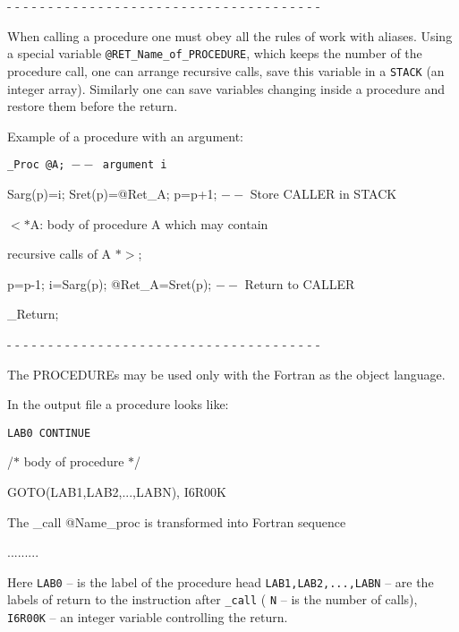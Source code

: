- - - - - - - - - - - - - - - - - - - - - - - - - - - - - - - - - - - - - -

When calling a procedure one must obey all the rules of work
with aliases.
Using a special variable
       {\tt @RET\_Name\_of\_PROCEDURE},
which keeps the number of the procedure call, one can arrange
recursive calls, save this variable in a
       {\tt STACK} (an integer array). Similarly one can save
variables changing inside a procedure and restore them before the
return.

       Example of a procedure with an argument:

       {\tt    \_Proc @A; $--$ argument  i

             Sarg(p)=i; Sret(p)=@Ret\_A; p=p+1; $--$ Store CALLER in STACK

               $<*$A: body of procedure A which may contain

                    recursive calls of A $*>$;

             p=p-1; i=Sarg(p); @Ret\_A=Sret(p); $--$ Return to CALLER

           \_Return;}

- - - - - - - - - - - - - - - - - - - - - - - - - - - - - - - - - - - - - -

   The    PROCEDUREs may be used only with
   the Fortran as the object language.

   In the output file a procedure looks like:

       {\tt LAB0  CONTINUE

       \qquad /$*$ body of procedure $*$/

       \qquad GOTO(LAB1,LAB2,...,LABN), I6R00K}

The \_call @Name\_proc is transformed into Fortran sequence

          \qquad .........


Here {\tt LAB0} -- is the label of the procedure head
       {\tt LAB1,LAB2,...,LABN} -- are the labels of return
      to the instruction after {\tt \_call}
       ( {\tt N} -- is the number of calls),
       {\tt I6R00K} -- an integer variable controlling the return.

